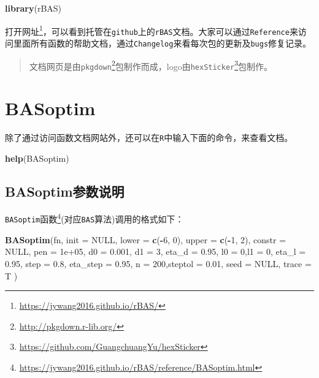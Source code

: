 \documentclass[]{ctexbook}
\newenvironment{Shaded}{\begin{snugshade}}{\end{snugshade}}
\newcommand{\KeywordTok}[1]{\textcolor[rgb]{0.13,0.29,0.53}{\textbf{#1}}}
\newcommand{\DataTypeTok}[1]{\textcolor[rgb]{0.13,0.29,0.53}{#1}}
\newcommand{\DecValTok}[1]{\textcolor[rgb]{0.00,0.00,0.81}{#1}}
\newcommand{\FloatTok}[1]{\textcolor[rgb]{0.00,0.00,0.81}{#1}}
\newcommand{\OtherTok}[1]{\textcolor[rgb]{0.56,0.35,0.01}{#1}}
\newcommand{\OperatorTok}[1]{\textcolor[rgb]{0.81,0.36,0.00}{\textbf{#1}}}
\newcommand{\NormalTok}[1]{#1}
\renewcommand{\href}[2]{#2\footnote{\url{#1}}}
\theoremstyle{definition}
\theoremstyle{definition}
\theoremstyle{definition}
\theoremstyle{remark}
\begin{document}
\begin{Shaded}
\begin{Highlighting}[]
\KeywordTok{library}\NormalTok{(rBAS)}
\end{Highlighting}
\end{Shaded}

打开\href{https://jywang2016.github.io/rBAS/}{网址}，可以看到托管在\texttt{github}上的\texttt{rBAS}文档。大家可以通过\texttt{Reference}来访问里面所有函数的帮助文档，通过\texttt{Changelog}来看每次包的更新及\texttt{bugs}修复记录。

\begin{quote}
文档网页是由\href{http://pkgdown.r-lib.org/}{\texttt{pkgdown}}包制作而成，logo由\href{https://github.com/GuangchuangYu/hexSticker}{\texttt{hexSticker}}包制作。
\end{quote}

\section{BASoptim}\label{basoptim}

除了通过访问函数文档网站外，还可以在\texttt{R}中输入下面的命令，来查看文档。

\begin{Shaded}
\begin{Highlighting}[]
\KeywordTok{help}\NormalTok{(BASoptim)}
\end{Highlighting}
\end{Shaded}

\subsection{BASoptim参数说明}\label{BASparms}

\href{https://jywang2016.github.io/rBAS/reference/BASoptim.html}{\texttt{BASoptim}函数}(对应\texttt{BAS}算法)调用的格式如下：

\begin{Shaded}
\begin{Highlighting}[]
\KeywordTok{BASoptim}\NormalTok{(fn, }
         \DataTypeTok{init =} \OtherTok{NULL}\NormalTok{, }
         \DataTypeTok{lower =} \KeywordTok{c}\NormalTok{(}\OperatorTok{-}\DecValTok{6}\NormalTok{, }\DecValTok{0}\NormalTok{), }\DataTypeTok{upper =} \KeywordTok{c}\NormalTok{(}\OperatorTok{-}\DecValTok{1}\NormalTok{, }\DecValTok{2}\NormalTok{),}
         \DataTypeTok{constr =} \OtherTok{NULL}\NormalTok{, }\DataTypeTok{pen =} \FloatTok{1e+05}\NormalTok{,}
         \DataTypeTok{d0 =} \FloatTok{0.001}\NormalTok{, }\DataTypeTok{d1 =} \DecValTok{3}\NormalTok{, }\DataTypeTok{eta_d =} \FloatTok{0.95}\NormalTok{, }
         \DataTypeTok{l0 =} \DecValTok{0}\NormalTok{,}\DataTypeTok{l1 =} \DecValTok{0}\NormalTok{, }\DataTypeTok{eta_l =} \FloatTok{0.95}\NormalTok{, }
         \DataTypeTok{step =} \FloatTok{0.8}\NormalTok{, }\DataTypeTok{eta_step =} \FloatTok{0.95}\NormalTok{, }
         \DataTypeTok{n =} \DecValTok{200}\NormalTok{,}\DataTypeTok{steptol =} \FloatTok{0.01}\NormalTok{, }
         \DataTypeTok{seed =} \OtherTok{NULL}\NormalTok{, }\DataTypeTok{trace =}\NormalTok{ T )}
\end{Highlighting}
\end{Shaded}
\end{document}
